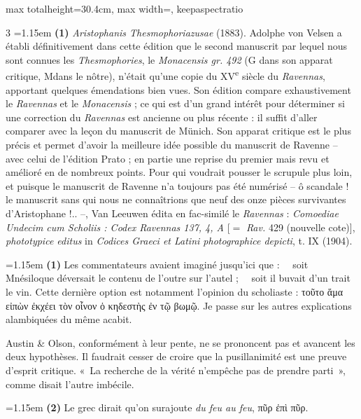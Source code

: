 \documentclass[11pt,twoside]{book}
\newcommand{\italique}[1]{\textit{#1}}
\newcommand{\nieme}[1]{#1\textsuperscript{e}}
\newcommand{\Mon}{M}
\begin{document}
\begin{adjustbox}{max totalheight=30.4cm, max width=\textwidth, keepaspectratio}
\begin{minipage}{\textwidth}
{\begin{multicols}{3}
\noindent\hangindent=1.15em {\color{sepiaNote}\textbf{(1)}} \italique{Aristophanis Thesmophoriazusae} (1883). Adolphe von Velsen a établi définitivement dans cette édition que le second manuscrit par lequel nous sont connues les \italique{Thesmophories}, le \italique{Monacensis gr. 492} (G dans son apparat critique, \Mon dans le nôtre), n'était qu'une copie du \nieme{XV} siècle du \italique{Ravennas}, apportant quelques émendations bien vues. Son édition compare exhaustivement le \italique{Ravennas} et le \italique{Monacensis} ; ce qui est d'un grand intérêt pour déterminer si une correction du \italique{Ravennas} est ancienne ou plus récente : il suffit d'aller comparer avec la leçon du manuscrit de Münich. Son apparat critique est le plus précis et permet d'avoir la meilleure idée possible du manuscrit de Ravenne -- avec celui de l'édition Prato ; en partie une reprise du premier mais revu et amélioré en de nombreux points. Pour qui voudrait pousser le scrupule plus loin, et puisque le manuscrit de Ravenne n'a toujours pas été numérisé -- ô scandale ! le manuscrit sans qui nous ne connaîtrions que neuf des onze pièces survivantes d'Aristophane !.. --, Van Leeuwen édita en fac-similé le \italique{Ravennas} : \italique{Comoediae Undecim cum Scholiis : Codex Ravennas 137, 4, A} [$=$ \italique{Rav.} 429 (nouvelle cote)], \italique{phototypice editus} in \italique{Codices Graeci et Latini photographice depicti}, t. IX (1904).
\par\vspace{1.5pt}
\noindent\hangindent=1.15em {\color{sepiaNote}\textbf{(1)}} Les commentateurs avaient imaginé jusqu'ici que : \ \ soit Mnésiloque déversait le contenu de l'outre sur l'autel ; \ \ soit il buvait d'un trait le vin. Cette dernière option est notamment l'opinion du scholiaste : τοῦτο ἅμα εἰπὼν ἐκχέει τὸν οἶνον ὁ κηδεστὴς ἐν τῷ βωμῷ. Je passe sur les autres explications alambiquées du même acabit.
\par\vspace{1.5pt}
\noindent Austin \& Olson, conformément à leur pente, ne se prononcent pas et avancent les deux hypothèses. Il faudrait cesser de croire que la pusillanimité est une preuve d'esprit critique. «~La recherche de la vérité n'empêche pas de prendre parti~», comme disait l'autre imbécile.
\par\vspace{1.5pt}
\noindent\hangindent=1.15em {\color{sepiaNote}\textbf{(2)}} Le grec dirait qu'on surajoute \italique{du feu au feu}, πῦρ ἐπὶ πῦρ.
\par\vspace{1.5pt}

\end{multicols}}
\end{minipage}
\end{adjustbox}
\end{document}
